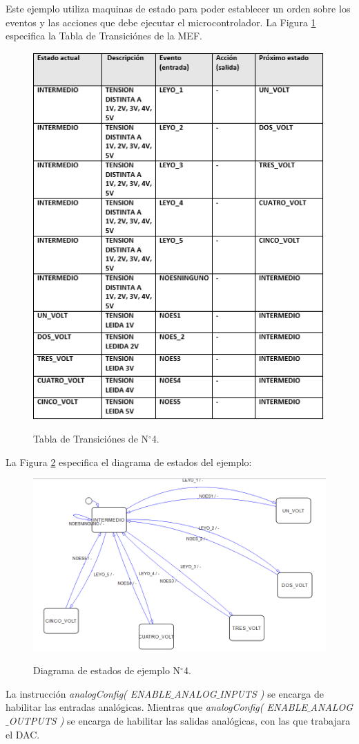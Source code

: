 \documentclass[12pt,letterpaper]{article}
\begin{document}
Este ejemplo utiliza maquinas de estado para poder establecer un orden sobre los eventos y las acciones que debe ejecutar el microcontrolador.
La Figura \ref{tablatransicionej4} especifica la Tabla de Transiciónes de la MEF.
\begin{figure}[H]
\centering
\includegraphics[width=8 cm]{figuras/IMAGEN-EJEMPLO4.png}\\
\caption{Tabla de Transiciónes de N$^{\circ}$4.}
\label{tablatransicionej4}
\end{figure}
La Figura \ref{diagramaej4} especifica el diagrama de estados del ejemplo:

\begin{figure}[H]
\centering
\includegraphics[width=8 cm]{figuras/ejemplo-4.png}\\
\caption{Diagrama de estados de ejemplo N$^{\circ}$4.}
\label{diagramaej4}
\end{figure}
La instrucción \textit{analogConfig( ENABLE$\_$ANALOG$\_$INPUTS )} se encarga de habilitar las entradas analógicas. Mientras que \textit{analogConfig( ENABLE$\_$ANALOG$\_$OUTPUTS )} se encarga de habilitar las salidas analógicas, con las que trabajara el DAC.
\end{document}
